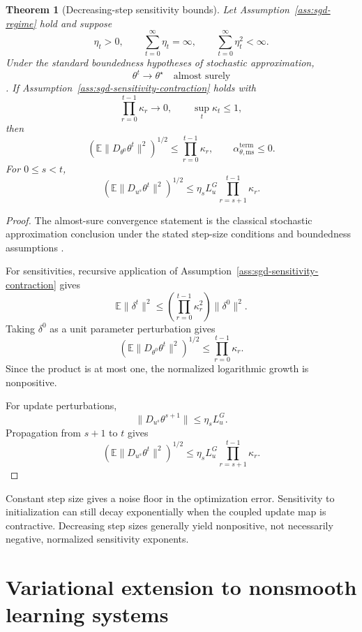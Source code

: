 \documentclass{article}
\newtheorem{theorem}{Theorem}[section]
\numberwithin{equation}{section}
\begin{document}
\begin{theorem}[Decreasing-step sensitivity bounds]
\label{thm:sgd-decreasing-stepsize}
Let Assumption~\ref{ass:sgd-regime} hold and suppose
\[
\eta_t>0,
\qquad
\sum_{t=0}^{\infty}\eta_t=\infty,
\qquad
\sum_{t=0}^{\infty}\eta_t^2<\infty .
\]
Under the standard boundedness hypotheses of stochastic approximation,
\[
\theta^t\to\theta^\star
\quad
\text{almost surely}
\]
\cite{KushnerYin2003,Benaim1999}. If Assumption~\ref{ass:sgd-sensitivity-contraction}
holds with
\[
\prod_{r=0}^{t-1}\kappa_r\to0,
\qquad
\sup_t\kappa_t\le1,
\]
then
\[
\left(
\mathbb{E}\|D_{\theta^0}\theta^t\|^2
\right)^{1/2}
\le
\prod_{r=0}^{t-1}\kappa_r ,
\qquad
\alpha_{\theta,\mathrm{ms}}^{\mathrm{term}}\le0 .
\]
For \(0\le s<t\),
\[
\left(
\mathbb{E}\|D_{u^s}\theta^t\|^2
\right)^{1/2}
\le
\eta_sL_u^G
\prod_{r=s+1}^{t-1}\kappa_r .
\]
\end{theorem}

\begin{proof}
The almost-sure convergence statement is the classical stochastic approximation
conclusion under the stated step-size conditions and boundedness assumptions
\cite{KushnerYin2003,Benaim1999}.

For sensitivities, recursive application of
Assumption~\ref{ass:sgd-sensitivity-contraction} gives
\[
\mathbb{E}\|\delta^t\|^2
\le
\left(\prod_{r=0}^{t-1}\kappa_r^2\right)\|\delta^0\|^2 .
\]
Taking \(\delta^0\) as a unit parameter perturbation gives
\[
\left(
\mathbb{E}\|D_{\theta^0}\theta^t\|^2
\right)^{1/2}
\le
\prod_{r=0}^{t-1}\kappa_r .
\]
Since the product is at most one, the normalized logarithmic growth is
nonpositive.

For update perturbations,
\[
\|D_{u^s}\theta^{s+1}\|\le \eta_sL_u^G .
\]
Propagation from \(s+1\) to \(t\) gives
\[
\left(
\mathbb{E}\|D_{u^s}\theta^t\|^2
\right)^{1/2}
\le
\eta_sL_u^G
\prod_{r=s+1}^{t-1}\kappa_r .
\]
\end{proof}

Constant step size gives a noise floor in the optimization error. Sensitivity
to initialization can still decay exponentially when the coupled update map is
contractive. Decreasing step sizes generally yield nonpositive, not necessarily
negative, normalized sensitivity exponents.

\section{Variational extension to nonsmooth learning systems}
\label{sec:variational-extension}
\end{document}
